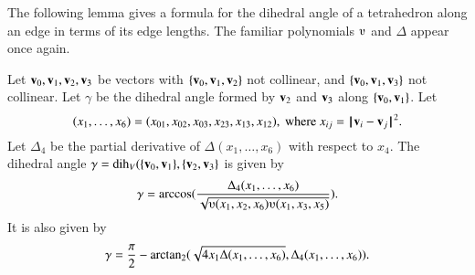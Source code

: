 The following lemma gives a formula for the dihedral angle
of a tetrahedron along an edge in terms of its edge lengths.  The
familiar polynomials $\ups$ and $\Delta$ appear once again.
%
%


\begin{lemma} \label{lemma:dihform}
Let ${\mathbf v}_0,{\mathbf v}_1,{\mathbf v}_2,{\mathbf v}_3$ 
be vectors with $\{{\mathbf v}_0,{\mathbf v}_1,{\mathbf v}_2\}$ not collinear, 
and $\{{\mathbf v}_0,{\mathbf v}_1,{\mathbf v}_3\}$ not
collinear. 
Let $\gamma$ be the dihedral angle formed
by ${\mathbf v}_2$ and ${\mathbf v}_3$ along $\{{\mathbf v}_0,{\mathbf v}_1\}$. Let
    \begin{displaymath}(x_1,\ldots,x_6) = 
    (x_{01},x_{02},x_{03},x_{23},x_{13},x_{12}),
    \text{ where } x_{ij}={\hskip0.1em|\hskip-0.15em|\hskip0.1em}{\mathbf v}_i - {\mathbf v}_j{\hskip0.1em|\hskip-0.15em|\hskip0.1em}^2.\end{displaymath}
Let $\Delta_4$ be the partial derivative of $\Delta(x_1,\ldots,x_6)$ with
respect to $x_4$.
The dihedral angle $\gamma=\operatorname{dih}_V(\{{\mathbf v}_0,{\mathbf v}_1\},\{{\mathbf v}_2,{\mathbf v}_3\}$
is given by
    \begin{displaymath}
    \gamma=\arccos(\frac{\Delta_4(x_1,\ldots,x_6)}{\sqrt{
    \ups(x_1,x_2,x_6)\ups(x_1,x_3,x_5)}}).
    \end{displaymath}
It is also given by
    \begin{displaymath}
    \gamma=\frac{\pi}{2} - {\operatorname{arctan_2}}
     ({\sqrt{4 x_1 \Delta(x_1,\ldots,x_6)}},{\Delta_4(x_1,\ldots,x_6)}).
    \end{displaymath}
\end{lemma}
%


